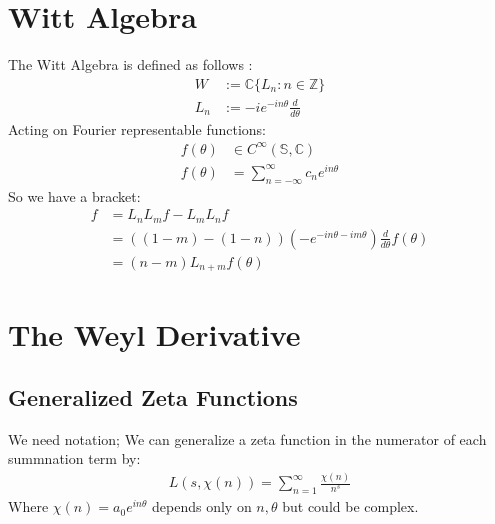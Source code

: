 \documentclass{artjlt}
\newcommand{\?}{\textbackslash}
\newcommand{\C}{\mathbb{C}}
\newcommand{\Z}{\mathbb{Z}}
\begin{document}
\section{Witt Algebra}
The Witt Algebra is defined as follows \cite{Schottenloher1997} \cite{Nam1999}:
\begin{align*}
W &:= \C \{L_n: n \in \Z\} \\
L_n &:= -i e^{-i n \theta} \frac{d}{d \theta}
\end{align*}
Acting on Fourier representable functions:
\begin{align*}
f(\theta) &\in C^\infty (\mathbb{S},\C) \\
f(\theta) &=\sum_{n=-\infty}^{\infty} c_n e^{i n \theta}
\end{align*} 
So we have a bracket:
\begin{align*}
  [L_n, L_m] f &= L_n L_m f - L_m L_n f \\
  &= ((1-m)-(1-n))(- e^{-i n \theta - i m \theta}) \frac{d}{d \theta} f(\theta) \\
  &=(n-m)L_{n+m} f(\theta)
\end{align*}
\section{The Weyl Derivative}
\subsection{Generalized Zeta Functions}
We need notation; We can generalize a zeta function in the numerator of each summnation term by:
\begin{align*}
  L(s,\chi(n)) = \sum_{n=1}^{\infty}\frac{\chi(n)}{n^s}
\end{align*}
Where $\chi(n)=a_0e^{in \theta}$ depends only on $n,\theta$ but could be complex. 
\end{document}
